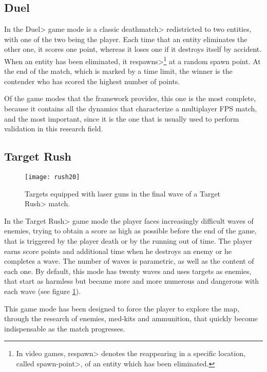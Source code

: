 \subsection{Duel}

In the \<Duel> game mode is a classic \<deathmatch> redistricted to two entities, with one of the two being the player. Each time that an entity eliminates the other one, it scores one point, whereas it loses one if it destroys itself by accident. When an entity has been eliminated, it \<respawns>\footnote{In video games, \<respawn> denotes the reappearing in a specific location, called \<spawn-point>, of an entity which has been eliminated.} at a random spawn point. At the end of the match, which is marked by a time limit, the winner is the contender who has scored the highest number of points.

\par

Of the game modes that the framework provides, this one is the most complete, because it contains all the dynamics that characterize a multiplayer FPS match, and the most important, since it is the one that is usually used to perform validation in this research field.

\subsection{Target Rush}

\begin{figure}
\centering
\texttt{[image: rush20]}
\caption{Targets equipped with laser guns in the final wave of a \<Target Rush> match.}
\label{fig:targets}
\end{figure}

In the \<Target Rush> game mode the player faces increasingly difficult waves of enemies, trying to obtain a score as high as possible before the end of the game, that is triggered by the player death or by the running out of time. The player earns score points and additional time when he destroys an enemy or he completes a wave. The number of waves is parametric, as well as the content of each one. By default, this mode has twenty waves and uses targets as enemies, that start as harmless but became more and more numerous and dangerous with each wave (see figure \ref{fig:targets}). 

\par

This game mode has been designed to force the player to explore the map, through the research of enemies, med-kits and ammunition, that quickly become indispensable as the match progresses.

